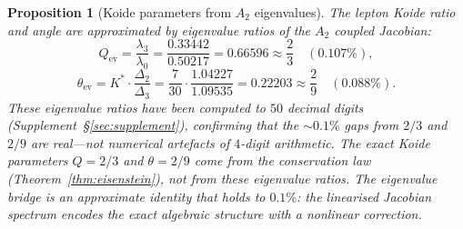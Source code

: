 \documentclass[11pt,a4paper]{article}
\newtheorem{proposition}[theorem]{Proposition}
\theoremstyle{definition}
\theoremstyle{remark}
\begin{document}
\begin{proposition}[Koide parameters from $A_2$ eigenvalues]\label{prop:ev_koide}
The lepton Koide ratio and angle are \emph{approximated} by eigenvalue ratios of the $A_2$ coupled Jacobian:
\begin{equation}\label{eq:Q_from_ev}
Q_{\mathrm{ev}} = \frac{\lambda_3}{\lambda_0} = \frac{0.33442}{0.50217} = 0.66596 \approx \frac{2}{3}\quad(0.107\%),
\end{equation}
\begin{equation}\label{eq:theta_from_ev}
\theta_{\mathrm{ev}} = K^*\cdot\frac{\Delta_2}{\Delta_3} = \frac{7}{30}\cdot\frac{1.04227}{1.09535} = 0.22203 \approx \frac{2}{9}\quad(0.088\%).
\end{equation}
These eigenvalue ratios have been computed to $50$ decimal digits (Supplement~\S\ref{sec:supplement}), confirming that the $\sim\!0.1\%$ gaps from $2/3$ and $2/9$ are real---not numerical artefacts of $4$-digit arithmetic. The exact Koide parameters $Q=2/3$ and $\theta=2/9$ come from the conservation law (Theorem~\ref{thm:eisenstein}), not from these eigenvalue ratios. The eigenvalue bridge is an approximate identity that holds to $0.1\%$: the linearised Jacobian spectrum encodes the exact algebraic structure with a nonlinear correction.
\end{proposition}
\end{document}
